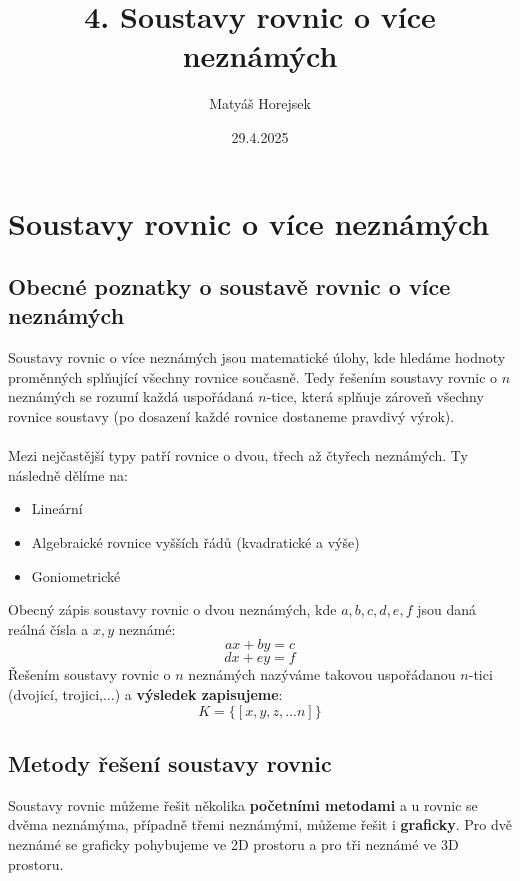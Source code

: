 \title{4. Soustavy rovnic o více neznámých}
\author{Matyáš Horejsek}
\date{29.4.2025}

\maketitle



\section{Soustavy rovnic o více neznámých}
    \subsection{Obecné poznatky o soustavě rovnic o více neznámých}
Soustavy rovnic o více neznámých jsou matematické úlohy, kde hledáme hodnoty proměnných splňující všechny rovnice současně. Tedy řešením soustavy rovnic o $n$ neznámých se rozumí každá uspořádaná $n$-tice, která splňuje zároveň všechny rovnice soustavy (po dosazení každé rovnice dostaneme pravdivý výrok).\\\\
Mezi nejčastější typy patří rovnice o dvou, třech až čtyřech neznámých. Ty následně dělíme na:
\begin{itemize}
    \item Lineární
    \item Algebraické rovnice vyšších řádů (kvadratické a výše)
    \item Goniometrické
\end{itemize}
Obecný zápis soustavy rovnic o dvou neznámých, kde $a, b, c, d, e, f$ jsou daná reálná čísla a $x, y $ neznámé:\\
$$
ax+by=c
$$
$$
dx+ey=f
$$
Řešením soustavy rovnic o $n$ neznámých nazýváme takovou uspořádanou $n$-tici (dvojicí, trojici,...) a \textbf{výsledek zapisujeme}:
$$
K=\{[x,y,z,...n]\}
$$
    \subsection{Metody řešení soustavy rovnic}
Soustavy rovnic můžeme řešit několika \textbf{početními metodami} a u rovnic se dvěma neznámýma, případně třemi neznámými, můžeme řešit i \textbf{graficky}. Pro dvě neznámé se graficky pohybujeme ve 2D prostoru a pro tři neznámé ve 3D prostoru. 
